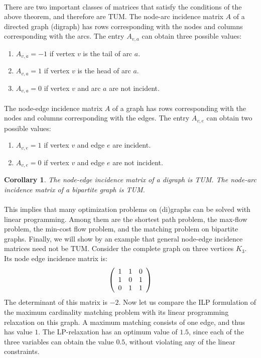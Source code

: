 \documentclass[titlepage]{book}
\theoremstyle{plain}
\newtheorem{corollary}[theorem]{Corollary}
\theoremstyle{definition}
\theoremstyle{remark}
\begin{document}
\paragraph{}
There are two important classes of matrices that satisfy the conditions of the above theorem, and therefore are TUM. The node-arc incidence matrix $A$ of a directed graph (digraph) has rows corresponding with
the nodes and columns corresponding with the arcs. The entry $A_{v,a}$ can obtain three possible values:
\begin{enumerate}
 \item $A_{v,a}=-1$ if vertex $v$ is the tail of arc $a$.
 \item $A_{v,a}=1$ if vertex $v$ is the head of arc $a$.
 \item $A_{v,a}=0$ if vertex $v$ and arc $a$ are not incident.
\end{enumerate}

\paragraph{}
The node-edge incidence matrix $A$ of a graph has rows corresponding with the nodes and columns corresponding with the edges. The entry $A_{v,e}$ can obtain two possible values:
\begin{enumerate}
 \item $A_{v,e}=1$ if vertex $v$ and edge $e$ are incident.
 \item $A_{v,e}=0$ if vertex $v$ and edge $e$ are not incident.
\end{enumerate}

\begin{corollary}
The node-edge incidence matrix of a digraph is TUM. The node-arc incidence matrix of a bipartite graph is TUM.
\end{corollary}

\paragraph{}
This implies that many optimization problems on (di)graphs can be solved with linear programming. Among them are the shortest path problem, the max-flow problem, the min-cost flow problem, and the matching problem on bipartite graphs. Finally, we will show by an example that general node-edge incidence matrices need not be TUM. Consider the complete graph on three vertices $K_3$. Its node edge
incidence matrix is:
\begin{equation}
\left( \begin{array}{ccc}
1&1&0\\
1&0&1\\
0&1&1
\end{array} \right)
\end{equation}
The determinant of this matrix is $-2$. Now let us compare the ILP formulation of the maximum cardinality matching problem with its linear programming relaxation on this graph. A maximum matching consists of one edge, and thus has value $1$. The LP-relaxation has an optimum value of $1.5$, since each of the three variables can obtain the value $0.5$, without violating any of the linear constraints.
\end{document}
